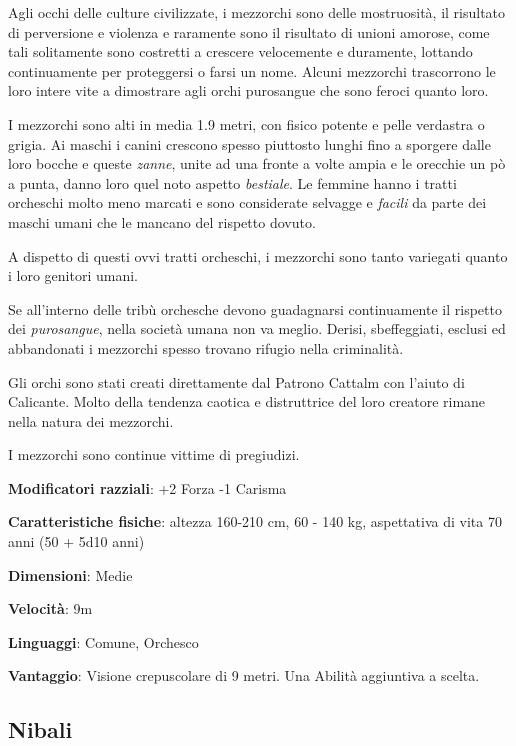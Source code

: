 \begin{multicols}{2}
Agli occhi delle culture civilizzate, i mezzorchi sono delle mostruosità, il risultato di perversione e violenza e raramente sono il risultato di unioni amorose, come tali solitamente sono costretti a crescere velocemente e duramente, lottando continuamente per proteggersi o farsi un nome. Alcuni mezzorchi trascorrono le loro intere vite a dimostrare agli orchi purosangue che sono feroci quanto loro.

I mezzorchi sono alti in media 1.9 metri, con fisico potente e pelle verdastra o grigia. Ai maschi i canini crescono spesso piuttosto lunghi fino a sporgere dalle loro bocche e queste \emph{zanne}, unite ad una fronte a volte ampia e le orecchie un pò a punta, danno loro quel noto aspetto \emph{bestiale}.
Le femmine hanno i tratti orcheschi molto meno marcati e sono considerate selvagge e \emph{facili} da parte dei maschi umani che le mancano del rispetto dovuto.

A dispetto di questi ovvi tratti orcheschi, i mezzorchi sono tanto variegati quanto i loro genitori umani.

Se all'interno delle tribù orchesche devono guadagnarsi continuamente il rispetto dei \emph{purosangue}, nella società umana non va meglio. Derisi, sbeffeggiati, esclusi ed abbandonati i mezzorchi spesso trovano rifugio nella criminalità.

Gli orchi sono stati creati direttamente dal Patrono Cattalm con l'aiuto di Calicante. Molto della tendenza caotica e distruttrice del loro creatore rimane nella natura dei mezzorchi.

I mezzorchi sono continue vittime di pregiudizi.

\textbf{Modificatori razziali}: +2 Forza -1 Carisma

\textbf{Caratteristiche fisiche}: altezza 160-210 cm, 60 - 140 kg, aspettativa di vita 70 anni (50 + 5d10 anni)

\textbf{Dimensioni}: Medie

\textbf{Velocità}: 9m

\textbf{Linguaggi}: Comune, Orchesco

\textbf{Vantaggio}: Visione crepuscolare di 9 metri. Una Abilità aggiuntiva a scelta.


\subsection{Nibali}\label{nibali}



\end{multicols}
